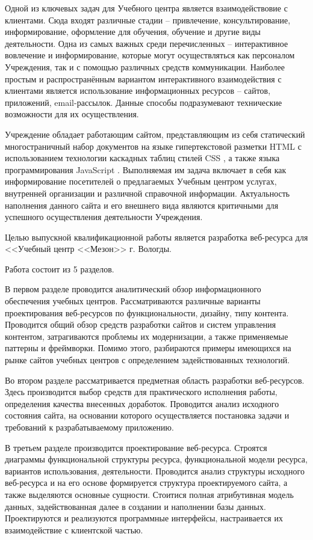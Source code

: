 Одной из ключевых задач для Учебного центра является взаимодействовие с клиентами.
Сюда входят различные стадии -- привлечение, консультирование, информирование, оформление для обучения, обучение и другие виды деятельности.
Одна из самых важных среди перечисленных -- интерактивное вовлечение и информирование, которые могут осуществляться как персоналом Учреждения, так и с помощью различных средств коммуникации.
Наиболее простым и распространённым вариантом интерактивного взаимодействия с клиентами является использование информационных ресурсов -- сайтов, приложений, email-рассылок.
Данные способы подразумевают технические возможности для их осуществления.

Учреждение обладает работающим сайтом, представляющим из себя статический многостраничный набор документов на языке гипертекстовой разметки HTML \cite{wiki-html} с использованием технологии каскадных таблиц стилей CSS \cite{wiki-css}, а также языка программирования JavaScript \cite{wiki-js}.
Выполняемая им задача включает в себя как информирование посетителей о предлагаемых Учебным центром услугах, внутренней организации и различной справочной информации.
Актуальность наполнения данного сайта и его внешнего вида являются критичными для успешного осуществления деятельности Учреждения.

Целью выпускной квалификационной работы является разработка веб-ресурса для <<Учебный центр <<Мезон>> г. Вологды.

Работа состоит из 5 разделов.

В первом разделе проводится аналитический обзор информационного обеспечения учебных центров.
Рассматриваются различные варианты проектирования веб-ресурсов по функциональности, дизайну, типу контента.
Проводится общий обзор средств разработки сайтов и систем управления контентом, затрагиваются проблемы их модернизации, а также применяемые паттерны и фреймворки.
Помимо этого, разбираются примеры имеющихся на рынке сайтов учебных центров с определением задействованных технологий.

Во втором разделе рассматривается предметная область разработки веб-ресурсов.
Здесь производится выбор средств для практического исполнения работы, определения качества внесенных доработок.
Проводится анализ исходного состояния сайта, на основании которого осуществляется постановка задачи и требований к разрабатываемому приложению.

В третьем разделе производится проектирование веб-ресурса.
Строятся диаграммы функциональной структуры ресурса, функциональной модели ресурса, вариантов использования, деятельности.
Проводится анализ структуры исходного веб-ресурса и на его основе формируется структура проектируемого сайта, а также выделяются основные сущности.
Стоитися полная атрибутивная модель данных, задействованная далее в создании и наполнении базы данных.
Проектируются и реализуются программные интерфейсы, настраивается их взаимодействие с клиентской частью.

